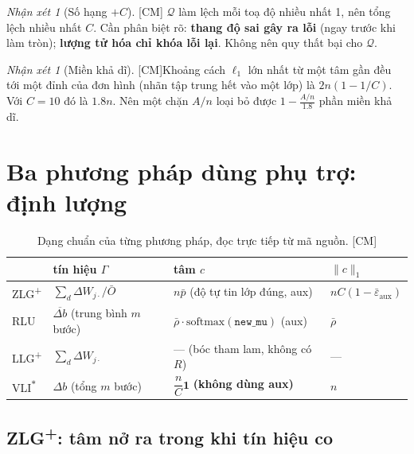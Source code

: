 \documentclass[11pt,a4paper]{article}
\theoremstyle{remark}
\newtheorem{nhanxet}[dinhly]{Nhận xét}
\newcommand{\one}{\mathbf{1}}
\newcommand{\quant}{\mathcal{Q}}
\newcommand{\epsaux}{\bar\varepsilon_{\mathrm{aux}}}
\newcommand{\CM}{\textsf{[CM]}}
\begin{document}
\begin{nhanxet}[Số hạng $+C$] \CM
$\quant$ làm lệch mỗi toạ độ nhiều nhất 1, nên tổng lệch nhiều nhất $C$. Cần
phân biệt rõ: \textbf{thang độ sai gây ra lỗi} (ngay trước khi làm tròn);
\textbf{lượng tử hóa chỉ khóa lỗi lại}. Không nên quy thất bại cho $\quant$.
\end{nhanxet}

\begin{nhanxet}[Miền khả dĩ] \CM\label{nx:mien}
Khoảng cách $\ell_1$ lớn nhất từ một tâm gần đều tới một đỉnh của đơn hình
(nhãn tập trung hết vào một lớp) là $2n(1-1/C)$. Với $C=10$ đó là $1.8n$. Nên
một chặn $A/n$ loại bỏ được $1-\frac{A/n}{1.8}$ phần miền khả dĩ.
\end{nhanxet}

\section{Ba phương pháp dùng phụ trợ: định lượng}

\begin{table}[htbp]
\centering
\caption{Dạng chuẩn của từng phương pháp, đọc trực tiếp từ mã nguồn. \CM}
\label{tab:dangchuan}
\small
\begin{tabular}{@{}llll@{}}
\toprule
 & \textbf{tín hiệu} $\Gamma$ & \textbf{tâm} $c$ & $\|c\|_1$ \\
\midrule
ZLG\textsuperscript{+}
  & $\sum_d\Delta W_{j\cdot}/\bar O$
  & $n\bar p$ (độ tự tin lớp đúng, aux)
  & $nC(1-\epsaux)$ \\
RLU
  & $\overline{\Delta b}$ (trung bình $m$ bước)
  & $\bar\rho\cdot\mathrm{softmax}(\texttt{new\_mu})$ (aux)
  & $\bar\rho$ \\
LLG\textsuperscript{+}
  & $\sum_d\Delta W_{j\cdot}$
  & --- (bóc tham lam, không có $R$)
  & --- \\
VLI\textsuperscript{$*$}
  & $\Delta b$ (tổng $m$ bước)
  & $\dfrac{n}{C}\one$ \textbf{(không dùng aux)}
  & $n$ \\
\bottomrule
\end{tabular}
\end{table}

\subsection{ZLG\textsuperscript{+}: tâm nở ra trong khi tín hiệu co}
\end{document}
